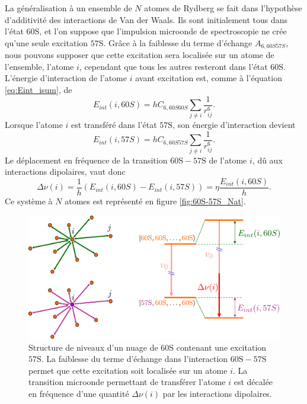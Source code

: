 La généralisation à un ensemble de $N$ atomes de Rydberg se fait dans l'hypothèse d'additivité des interactions de Van der Waals.
Ils sont initialement tous dans l'état $\mathrm{60S}$, et l'on suppose que l'impulsion microonde de spectroscopie ne crée qu'une seule excitation $\mathrm{57S}$.
Grâce à la faiblesse du terme d'échange $A_{6,60S57S}$, nous pouvons supposer que cette excitation sera localisée sur un atome de l'ensemble, l'atome $i$, cependant que tous les autres resteront dans l'état $\mathrm{60S}$.
L'énergie d'interaction de l'atome $i$ avant excitation est, comme à l'équation \eqref{eq:Eint_isum}, de
\begin{equation}
\label{eq:Eint_i60S}
E_{int}(i,60S) = hC_{6,60S60S}\sum_{j\neq i} \frac{1}{r_{ij}^6}.
\end{equation}
Lorsque l'atome $i$ est transféré dans l'état $\mathrm{57S}$, son énergie d'interaction devient
\begin{equation}
\label{eq:Eint_i57S}
E_{int}(i,57S) = hC_{6,60S57S}\sum_{j\neq i} \frac{1}{r_{ij}^6}.
\end{equation}
Le déplacement en fréquence de la transition $\mathrm{60S-57S}$ de l'atome $i$, dû aux interactions dipolaires, vaut donc
\begin{equation}
\label{eq:DeltaNu_i}
\Delta\nu (i) = \frac{1}{h}(E_{int}(i,60S)-E_{int}(i,57S)) = \eta \frac{E_{int}(i,60S)}{h}.
\end{equation}
Ce système à $N$ atomes est représenté en figure \eqref{fig:60S-57S_Nat}.
%
\begin{figure}[!h]
\centering
\includegraphics[width=\linewidth]{figures/low_l/60S-57S_Nat}
\caption[Structure de niveaux d'un nuage de $\mathrm{60S}$ contenant une excitation $\mathrm{57S}$]{
Structure de niveaux d'un nuage de $\mathrm{60S}$ contenant une excitation $\mathrm{57S}$.
La faiblesse du terme d'échange dans l'interaction $\mathrm{60S-57S}$ permet que cette excitation soit localisée sur un atome $i$.
La transition microonde permettant de transférer l'atome $i$ est décalée en fréquence d'une quantité $\Delta\nu(i)$ par les interactions dipolaires.
}
\label{fig:60S-57S_Nat}
\end{figure}
